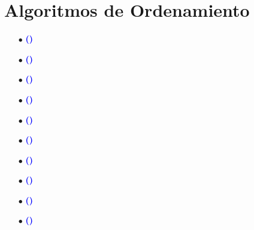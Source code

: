 \documentclass[12pt]{article}
\begin{document}
\section{Algoritmos de Ordenamiento}
{
    
    \begin{enumerate}
        \item[$\bullet$]\textbf{\textcolor{blue}{()}  }{}
        
        \item[$\bullet$]\textbf{\textcolor{blue}{()}  }{}
        
        \item[$\bullet$]\textbf{\textcolor{blue}{()}  }{}
        
        \item[$\bullet$]\textbf{\textcolor{blue}{()}  }{}
        
        \item[$\bullet$]\textbf{\textcolor{blue}{()}  }{}
        
        \item[$\bullet$]\textbf{\textcolor{blue}{()}  }{}
        
        \item[$\bullet$]\textbf{\textcolor{blue}{()}  }{}
        
        \item[$\bullet$]\textbf{\textcolor{blue}{()}  }{}
        
        \item[$\bullet$]\textbf{\textcolor{blue}{()}  }{}
        
        \item[$\bullet$]\textbf{\textcolor{blue}{()}  }{}
    \end{enumerate}
    
}
\end{document}
